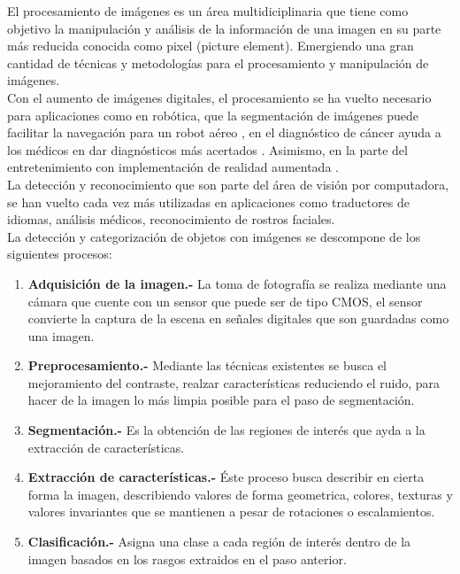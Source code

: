 \documentclass[a4paper, 11pt]{article}
\begin{document}
El procesamiento de imágenes es un área multidiciplinaria que tiene como objetivo la manipulación y análisis de la información de una imagen en su parte más reducida conocida como pixel (picture element). Emergiendo una gran cantidad de técnicas y metodologías para el procesamiento y manipulación de imágenes.\\

Con el aumento de imágenes digitales, el procesamiento se ha vuelto necesario para aplicaciones como en robótica, que la segmentación de imágenes puede facilitar la navegación para un robot aéreo \cite{smolyanskiy2017lowflying}, en el diagnóstico de cáncer ayuda a los médicos en dar diagnósticos más acertados \cite{10059977}. Asimismo, en la parte del entretenimiento con implementación de realidad aumentada \cite{8776989} .\\

La detección y reconocimiento que son parte del área de visión por computadora, se han vuelto cada vez más utilizadas en aplicaciones como traductores de idiomas, análisis médicos, reconocimiento de rostros faciales.\\

La detección y categorización de objetos con imágenes se descompone de los siguientes procesos:

\begin{enumerate}
\item \textbf{Adquisición de la imagen.-} La toma de fotografía se realiza mediante una cámara  que cuente con un sensor que puede ser de tipo CMOS, el sensor convierte la captura de la escena en señales digitales que son guardadas como una imagen.
\item \textbf{Preprocesamiento.-} Mediante las técnicas existentes se busca el mejoramiento del contraste, realzar características reduciendo el ruido, para hacer de la imagen lo más limpia posible para el paso de segmentación. 
\item \textbf{Segmentación.-} Es la obtención de las regiones de interés que ayda a la extracción de características.
\item \textbf{Extracción de características.-} Éste proceso busca describir en cierta forma la imagen, describiendo valores de forma geometrica, colores, texturas y valores invariantes que se mantienen a pesar de rotaciones o escalamientos.
\item \textbf{Clasificación.-} Asigna una clase a cada región de interés dentro de la imagen basados en los rasgos extraidos en el paso anterior.
\end{enumerate}
\end{document}
